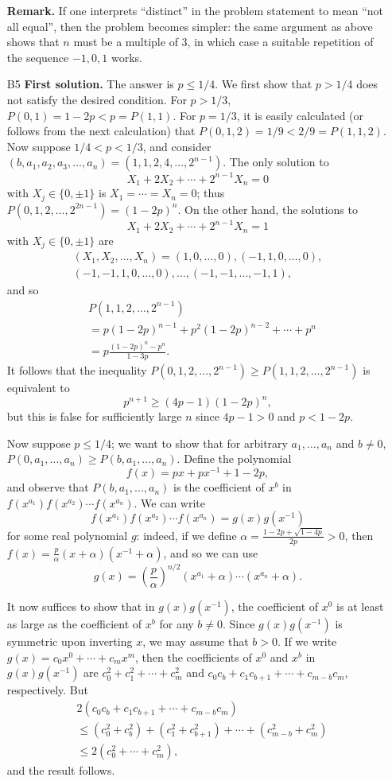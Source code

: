 \documentclass[amssymb,twocolumn,pra,10pt,aps]{revtex4-1}
\begin{document}
\begin{itemize}
\noindent
\textbf{Remark.}
If one interprets ``distinct'' in the problem statement to mean ``not all equal'', then the problem becomes simpler:
the same argument as above shows that $n$ must be a multiple of 3, in which case a suitable repetition of the sequence $-1,0,1$ works. 

\item[B5]
\textbf{First solution.}
The answer is $p \leq 1/4$. We first show that $p >1/4$ does not satisfy the desired condition. For $p>1/3$, $P(0,1) = 1-2p < p = P(1,1)$. For $p=1/3$, it is easily calculated (or follows from the next calculation) that $P(0,1,2) = 1/9 < 2/9 = P(1,1,2)$. Now suppose $1/4 < p < 1/3$, and consider $(b,a_1,a_2,a_3,\ldots,a_n) = (1,1,2,4,\ldots,2^{n-1})$.  The only solution to
\[
X_1+2X_2+\cdots+2^{n-1}X_n = 0
\]
with $X_j \in \{0,\pm 1\}$ is $X_1=\cdots=X_n=0$; thus $P(0,1,2,\ldots,2^{2n-1}) = (1-2p)^n$. On the other hand, the solutions to
\[
X_1+2X_2+\cdots+2^{n-1}X_n = 1
\]
with $X_j \in \{0,\pm 1\}$ are 
\begin{gather*}
(X_1,X_2,\ldots,X_n) = (1,0,\ldots,0),(-1,1,0,\ldots,0), \\
(-1,-1,1,0,\ldots,0), \ldots, (-1,-1,\ldots,-1,1),
\end{gather*}
and so
\begin{align*}
&P(1,1,2,\ldots,2^{n-1}) \\
& = p(1-2p)^{n-1}+p^2(1-2p)^{n-2}+\cdots+p^n \\
&= p\frac{(1-2p)^{n}-p^{n}}{1-3p}.
\end{align*}
It follows that the inequality
$P(0,1,2,\ldots,2^{n-1}) \geq P(1,1,2,\ldots,2^{n-1})$ is equivalent to 
\[
p^{n+1} \geq (4p-1)(1-2p)^n,
\]
but this is false for sufficiently large $n$ since $4p-1>0$ and $p<1-2p$.

Now suppose $p \leq 1/4$; we want to show that for arbitrary $a_1,\ldots,a_n$ and $b \neq 0$, $P(0,a_1,\ldots,a_n) \geq P(b,a_1,\ldots,a_n)$. Define the polynomial
\[
f(x) = px+px^{-1}+1-2p, 
\]
and observe that $P(b,a_1,\ldots,a_n)$ is the coefficient of $x^b$ in
$f(x^{a_1})f(x^{a_2})\cdots f(x^{a_n})$. We can write
\[
f(x^{a_1})f(x^{a_2})\cdots f(x^{a_n}) = g(x)g(x^{-1})
\]
for some real polynomial $g$: indeed, if we define $\alpha = \frac{1-2p+\sqrt{1-4p}}{2p} > 0$, then $f(x) = \frac{p}{\alpha}(x+\alpha)(x^{-1}+\alpha)$, and so we can use
\[
g(x) = \left(\frac{p}{\alpha}\right)^{n/2} (x^{a_1}+\alpha)\cdots(x^{a_n}+\alpha).
\]

It now suffices to show that in $g(x)g(x^{-1})$, the coefficient of $x^0$ is at least as large as the coefficient of $x^b$ for any $b \neq 0$. Since $g(x)g(x^{-1})$ is symmetric upon inverting $x$, we may assume that $b > 0$. If we write $g(x) = c_0 x^0 + \cdots + c_m x^m$, then the coefficients of $x^0$ and $x^b$ in $g(x)g(x^{-1})$ are $c_0^2+c_1^2+\cdots+c_m^2$ and $c_0c_b+c_1c_{b+1}+\cdots+c_{m-b}c_m$, respectively. But
\begin{align*}
&2(c_0c_b+c_1c_{b+1}+\cdots+c_{m-b}c_m)\\
&\leq (c_0^2+c_b^2)+(c_1^2+c_{b+1}^2)+\cdots+(c_{m-b}^2+c_m^2) \\
& \leq
2(c_0^2+\cdots+c_m^2),
\end{align*}
and the result follows.


\end{itemize}
\end{document}

